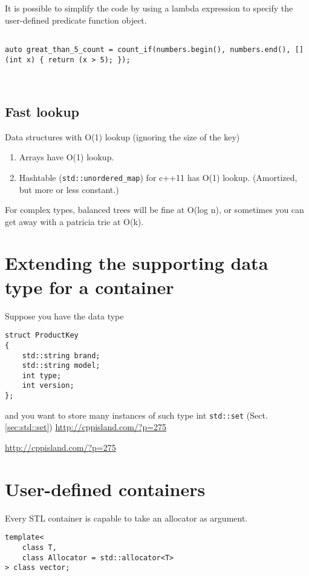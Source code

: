 It is possible to simplify the code by using a lambda expression to specify the user-defined predicate function object.
\begin{verbatim}

auto great_than_5_count = count_if(numbers.begin(), numbers.end(), [](int x) { return (x > 5); });
    
    
\end{verbatim} 
 
\subsection{Fast lookup}

Data structures with O(1) lookup (ignoring the size of the key)
\begin{enumerate}
  \item  Arrays have O(1) lookup. 
  
  \item Hashtable (\verb!std::unordered_map!) for c++11 has O(1) lookup. (Amortized, but more or less constant.)
\end{enumerate}

For complex types, balanced trees will be fine at O(log n), or sometimes you can
get away with a patricia trie at O(k).



\section{Extending the supporting data type for a container}
\label{sec:extend-data-support-for-container}

Suppose you have the data type
\begin{verbatim}
struct ProductKey
{
	std::string brand;
	std::string model;
	int type;
	int version;
};
\end{verbatim}

and you want to store many instances of such type int \verb!std::set! (Sect.\ref{sec:std::set})
\url{http://cppisland.com/?p=275}



\url{http://cppisland.com/?p=275}

\section{User-defined containers}
\label{sec:container-user-defined}


Every STL container is capable to take an allocator as argument. 
\begin{lstlisting}
template<
    class T,
    class Allocator = std::allocator<T>
> class vector;
\end{lstlisting}

